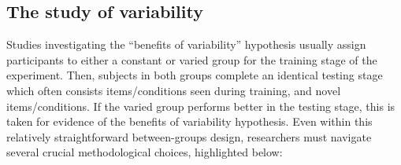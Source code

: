 \documentclass[
  12pt,
  letterpaper,
]{article}
\begin{document}
\subsection{The study of variability}\label{the-study-of-variability}

Studies investigating the ``benefits of variability'' hypothesis usually
assign participants to either a constant or varied group for the
training stage of the experiment. Then, subjects in both groups complete
an identical testing stage which often consists items/conditions seen
during training, and novel items/conditions. If the varied group
performs better in the testing stage, this is taken for evidence of the
benefits of variability hypothesis. Even within this relatively
straightforward between-groups design, researchers must navigate several
crucial methodological choices, highlighted below:
\end{document}
